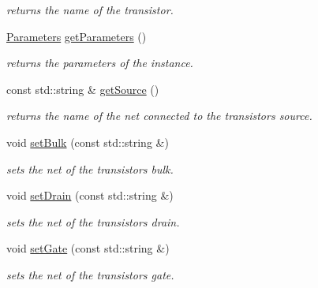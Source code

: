 \begin{DoxyCompactItemize}
\begin{DoxyCompactList}\small\item\em returns the name of the transistor. \end{DoxyCompactList}\item 
\mbox{\label{class_open_chams_1_1_transistor_a2e51ad4344607fc279c5c8cda4edae02}} 
\mbox{\hyperlink{class_open_chams_1_1_parameters}{Parameters}} \mbox{\hyperlink{class_open_chams_1_1_transistor_a2e51ad4344607fc279c5c8cda4edae02}{get\+Parameters}} ()
\begin{DoxyCompactList}\small\item\em returns the parameters of the instance. \end{DoxyCompactList}\item 
\mbox{\label{class_open_chams_1_1_transistor_aee4d52a0b13e6db247c1a6c051aede25}} 
const std\+::string \& \mbox{\hyperlink{class_open_chams_1_1_transistor_aee4d52a0b13e6db247c1a6c051aede25}{get\+Source}} ()
\begin{DoxyCompactList}\small\item\em returns the name of the net connected to the transistor\textquotesingle{}s source. \end{DoxyCompactList}\item 
void \mbox{\hyperlink{class_open_chams_1_1_transistor_a1484abe63e3f8ffbc2911c5230fa7091}{set\+Bulk}} (const std\+::string \&)
\begin{DoxyCompactList}\small\item\em sets the net of the transistor\textquotesingle{}s bulk. \end{DoxyCompactList}\item 
void \mbox{\hyperlink{class_open_chams_1_1_transistor_a72ff8491040e3fdc1c8bd62b2392ab82}{set\+Drain}} (const std\+::string \&)
\begin{DoxyCompactList}\small\item\em sets the net of the transistor\textquotesingle{}s drain. \end{DoxyCompactList}\item 
void \mbox{\hyperlink{class_open_chams_1_1_transistor_a705b53a51f0e265533b228f6e8beaf50}{set\+Gate}} (const std\+::string \&)
\begin{DoxyCompactList}\small\item\em sets the net of the transistor\textquotesingle{}s gate. \end{DoxyCompactList}\item 

\end{DoxyCompactItemize}
